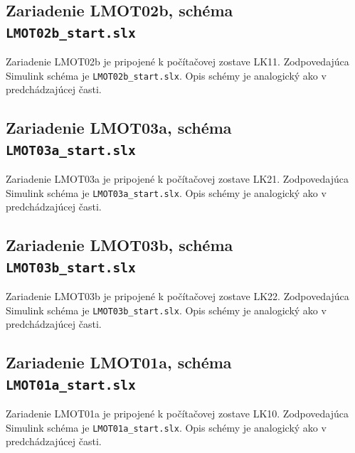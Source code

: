 \documentclass[a4paper, 10pt, ]{article}
\begin{document}
\subsection{Zariadenie LMOT02b, schéma \texttt{LMOT02b\_start.slx}}

Zariadenie \textsf{LMOT02b} je pripojené k počítačovej zostave \textsf{LK11}. Zodpovedajúca Simulink schéma je \texttt{LMOT02b\_start.slx}. Opis schémy je analogický ako v predchádzajúcej časti.




\subsection{Zariadenie LMOT03a, schéma \texttt{LMOT03a\_start.slx}}

Zariadenie \textsf{LMOT03a} je pripojené k počítačovej zostave \textsf{LK21}. Zodpovedajúca Simulink schéma je \texttt{LMOT03a\_start.slx}. Opis schémy je analogický ako v predchádzajúcej časti.



\subsection{Zariadenie LMOT03b, schéma \texttt{LMOT03b\_start.slx}}

Zariadenie \textsf{LMOT03b} je pripojené k počítačovej zostave \textsf{LK22}. Zodpovedajúca Simulink schéma je \texttt{LMOT03b\_start.slx}. Opis schémy je analogický ako v predchádzajúcej časti.


\subsection{Zariadenie LMOT01a, schéma \texttt{LMOT01a\_start.slx}}

Zariadenie \textsf{LMOT01a} je pripojené k počítačovej zostave \textsf{LK10}. Zodpovedajúca Simulink schéma je \texttt{LMOT01a\_start.slx}. Opis schémy je analogický ako v predchádzajúcej časti.











































\end{document}
